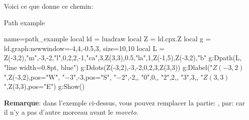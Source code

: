 Voici ce que donne ce chemin:
\begin{demo}{Path example}
\begin{luadraw}{name=path_example}
local ld = luadraw
local Z = ld.cpx.Z
local g = ld.graph:new{window={-4,4,-0.5,3}, size={10,10}}
local L = { Z(-3,2),"m",-3,-2,"l",0,2,2,-1,"ca",3,Z(3,3),0.5,"la",1,Z(-1,5),Z(-3,2),"b" }
g:Dpath(L, "line width=0.8pt, blue")
g:Ddots({Z(-3,2),-3,-2,0,2,3,Z(3,3)})
g:Dlabel("$Z(-3,2)$",Z(-3,2),{pos="W"}, "$-3$",-3,{pos="S"}, "$-2$",-2,{},
"$0$",0,{}, "$2$",2,{}, "$3$",3,{}, "$Z(3,3)$",Z(3,3),{pos="E"})
g:Show()
\end{luadraw}
\end{demo}

\noindent\textbf{Remarque}: dans l'exemple ci-dessus, vous pouvez remplacer la partie: , par:  car il n'y a pas d'autre morceau avant le \emph{moveto}.

